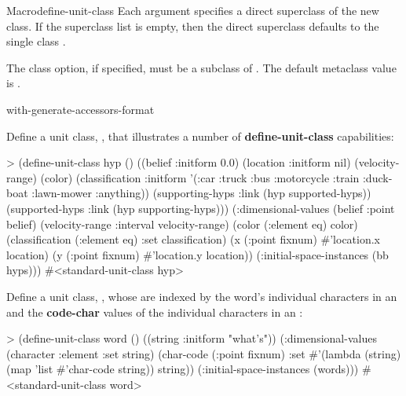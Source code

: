 \documentclass[10pt,twoside,english,pdftex]{article}
\begin{document}
\begin{functiondoc}{Macro}{define-unit-class}
%
Each  argument specifies a direct superclass of the new
class. If the superclass list is empty, then the direct superclass defaults to the
single class \textbf{}.

%
The  class option, if specified, must be a subclass
of \textbf{}.  The default metaclass
value is \textbf{}.

\classoptioninheritance

\begin{alsos}{with-generate-accessors-format}
\end{alsos}

\fnexamples
%
Define a unit class, , that illustrates a number of
\textbf{define-unit-class} capabilities:
%
\W\supp
\begin{example}
> (define-unit-class hyp ()
    ((belief :initform 0.0)
     (location :initform nil)
     (velocity-range)
     (color)
     (classification :initform '(:car :truck :bus :motorcycle :train :duck-boat 
                                 :lawn-mower :anything))
     (supporting-hyps 
      :link (hyp supported-hyps))
     (supported-hyps 
      :link (hyp supporting-hyps)))
    (:dimensional-values 
     (belief :point belief)
     (velocity-range :interval velocity-range)
     (color (:element eq) color)
     (classification (:element eq) :set classification)
     (x (:point fixnum) #'location.x location)
     (y (:point fixnum) #'location.y location))
    (:initial-space-instances (bb hyps)))
#<standard-unit-class hyp>
\end{example}

Define a unit class, , whose  are indexed by the
word's individual characters in an  and the
\textbf{code-char} values of the individual characters in an
:
%
\W\supp
\begin{example}
> (define-unit-class word ()
    ((string :initform "what's"))
    (:dimensional-values
     (character :element :set string)
     (char-code (:point fixnum) :set 
                #'(lambda (string)
                    (map 'list #'char-code string))
                string))
    (:initial-space-instances (words)))
#<standard-unit-class word>
\end{example}

\end{functiondoc}
\end{document}
